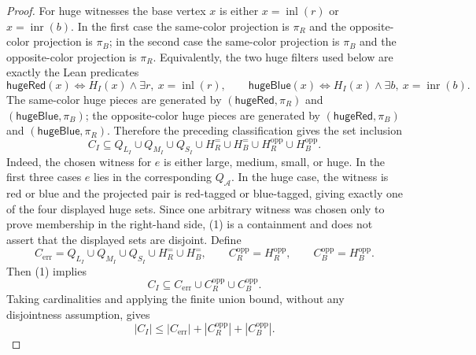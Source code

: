 \begin{proof}
For huge witnesses the base vertex \(x\) is either \(x=\operatorname{inl}(r)\)
or \(x=\operatorname{inr}(b)\).  In the first case the same-color projection is
\(\pi_R\) and the opposite-color projection is \(\pi_B\); in the second case
the same-color projection is \(\pi_B\) and the opposite-color projection is
\(\pi_R\).  Equivalently, the two huge filters used below are exactly the
Lean predicates
\[
\mathsf{hugeRed}(x)\Longleftrightarrow H_I(x)\land
  \exists r,\ x=\operatorname{inl}(r),
\qquad
\mathsf{hugeBlue}(x)\Longleftrightarrow H_I(x)\land
  \exists b,\ x=\operatorname{inr}(b).
\]
The same-color huge pieces are generated by
\((\mathsf{hugeRed},\pi_R)\) and \((\mathsf{hugeBlue},\pi_B)\); the
opposite-color huge pieces are generated by
\((\mathsf{hugeRed},\pi_B)\) and \((\mathsf{hugeBlue},\pi_R)\).  Therefore
the preceding classification gives the set inclusion
\[
C_I\subseteq
Q_{L_I}\cup Q_{M_I}\cup Q_{S_I}\cup
H_R^{=}\cup H_B^{=}\cup
H_R^{\mathrm{opp}}\cup H_B^{\mathrm{opp}}. \tag{1}
\]
Indeed, the chosen witness for \(e\) is either large, medium, small, or huge.
In the first three cases \(e\) lies in the corresponding \(Q_{\mathcal A}\).
In the huge case, the witness is red or blue and the projected pair is
red-tagged or blue-tagged, giving exactly one of the four displayed huge
sets.  Since one arbitrary witness was chosen only to prove membership in the
right-hand side, (1) is a containment and does not assert that the displayed
sets are disjoint.  Define
\[
C_{\mathrm{err}}=
Q_{L_I}\cup Q_{M_I}\cup Q_{S_I}\cup H_R^{=}\cup H_B^{=},
\qquad
C_R^{\mathrm{opp}}=H_R^{\mathrm{opp}},\qquad
C_B^{\mathrm{opp}}=H_B^{\mathrm{opp}}.
\]
Then (1) implies
\[
C_I\subseteq
C_{\mathrm{err}}\cup C_R^{\mathrm{opp}}\cup C_B^{\mathrm{opp}}.
\]
Taking cardinalities and applying the finite union bound, without any
disjointness assumption, gives
\[
|C_I|\le |C_{\mathrm{err}}|
       +|C_R^{\mathrm{opp}}|+|C_B^{\mathrm{opp}}|. \tag{2}
\]


\end{proof}
